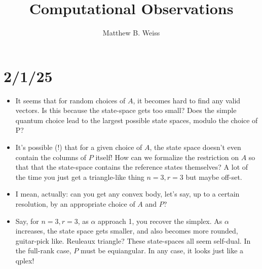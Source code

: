 \documentclass[11pt]{article}
\title{Computational Observations}
\author{Matthew B. Weiss}
\begin{document}
\maketitle

\section{2/1/25}
\begin{itemize}
\item It seems that for random choices of $A$, it becomes hard to find any valid vectors. Is this because the state-space gets too small? Does the simple quantum choice lead to the largest possible state spaces, modulo the choice of P?
\item It's possible (!) that for a given choice of $A$, the state space doesn't even contain the columns of $P$ itself! How can we formalize the restriction on $A$ so that that the state-space contains the reference states themselves? A lot of the time you just get a triangle-like thing $n=3, r=3$ but maybe off-set.
\item I mean, actually: can you get any convex body, let's say, up to a certain resolution, by an appropriate choice of $A$ and $P$?
\item Say, for $n=3, r=3$, as $\alpha$ approach 1, you recover the simplex. As $\alpha$ increases, the state space gets smaller, and also becomes more rounded, guitar-pick like. Reuleaux triangle? These state-spaces all seem self-dual. In the full-rank case, $P$ must be equiangular. In any case, it looks just like a qplex!
\end{itemize}
\end{document}
